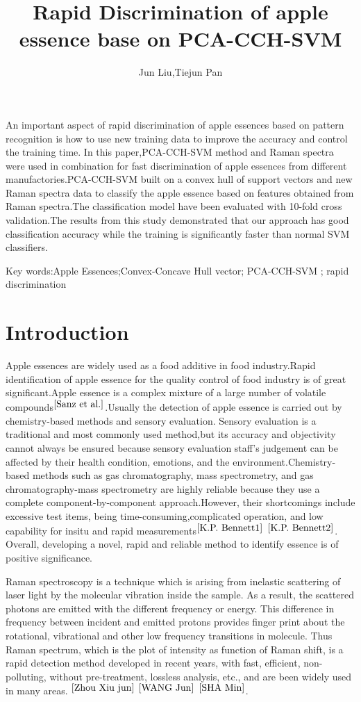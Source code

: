 \documentclass[a4paper]{article}
\date{} %
\title{Rapid Discrimination of apple essence base on PCA-CCH-SVM  }
\author{Jun Liu,Tiejun Pan}
\begin{document}
\maketitle

An important aspect of rapid discrimination of apple essences based on pattern recognition is how to use new training data to improve the accuracy and control the training time. In this paper,PCA-CCH-SVM method and Raman spectra were used in combination for fast discrimination of apple essences from different manufactories.PCA-CCH-SVM built on a convex hull of support vectors and new Raman spectra data to classify the apple essence based on features obtained from Raman spectra.The classification model have been evaluated with 10-fold cross validation.The results from this study demonstrated that our approach has good classiﬁcation accuracy while the training is signiﬁcantly faster than normal SVM classiﬁers.

Key words:Apple Essences;Convex-Concave Hull vector; PCA-CCH-SVM ; rapid discrimination

\section{Introduction}
Apple essences are widely used as a food additive in food industry.Rapid identification of apple essence for the quality control of food industry is of great significant.Apple essence is a complex mixture of a large number of volatile compounds$^{\cite{Sanz et al.}}$.Usually the detection of apple essence is carried out by chemistry-based methods and sensory evaluation. Sensory evaluation is a traditional and most commonly used method,but its accuracy and objectivity cannot always be ensured because sensory evaluation staff’s judgement can be affected by their health condition, emotions, and the environment.Chemistry-based methods such as gas chromatography, mass spectrometry, and gas chromatography-mass spectrometry are highly reliable because they use a complete component-by-component approach.However, their shortcomings include excessive test items, being time-consuming,complicated operation, and low capability for insitu and rapid measurements$^{\cite{K.P. Bennett1}}$ $^{\cite{K.P. Bennett2}}$. Overall, developing a novel, rapid and reliable method to identify  essence is of positive significance.

Raman spectroscopy is a technique which is arising from inelastic scattering of laser light by the molecular vibration inside the sample. As a result, the scattered photons are emitted with the different frequency or energy. This difference in frequency between incident and emitted protons provides finger print about the rotational, vibrational and other low frequency transitions in molecule. Thus Raman spectrum, which is the plot of intensity as function of Raman shift, is a rapid detection method developed in recent years, with fast, efficient, non-polluting, without pre-treatment, lossless analysis, etc., and are been widely used in many areas. $^{\cite{Zhou Xiu jun}}$
$^{\cite{WANG Jun}}$ $^{\cite{SHA Min}}$.
\end{document}
